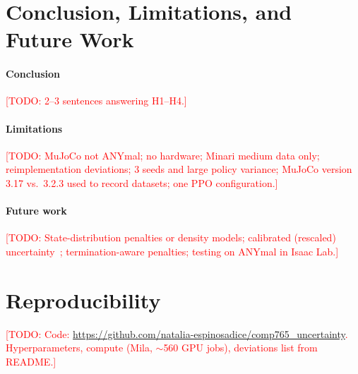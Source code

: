 \documentclass[conference]{IEEEtran}
\newcommand{\todo}[1]{\textcolor{red}{[TODO: #1]}}
\begin{document}
\section{Conclusion, Limitations, and Future Work}
\label{sec:conclusion}
\paragraph{Conclusion} \todo{2--3 sentences answering H1--H4.}

\paragraph{Limitations} \todo{MuJoCo not ANYmal; no hardware; Minari medium data only;
reimplementation deviations; 3 seeds and large policy variance; MuJoCo version 3.17 vs.\ 3.2.3
used to record datasets; one PPO configuration.}

\paragraph{Future work} \todo{State-distribution penalties or density models; calibrated
(rescaled) uncertainty~\cite{kuleshov2018calibrated}; termination-aware penalties; testing on
ANYmal in Isaac Lab.}




\appendix
\section{Reproducibility}
\todo{Code: \url{https://github.com/natalia-espinosadice/comp765_uncertainty}. Hyperparameters,
compute (Mila, $\sim$560 GPU jobs), deviations list from README.}
\end{document}
